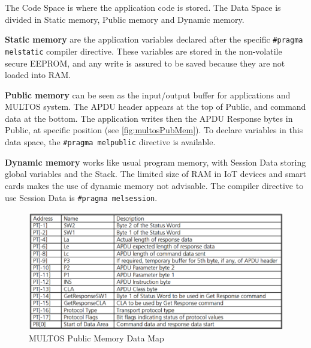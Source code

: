 The Code Space is where the application code is stored.
The Data Space is divided in Static memory, Public memory and Dynamic memory.

\textbf{Static memory} are the application variables declared after the specific \texttt{\#pragma melstatic} compiler directive. These variables are stored in the non-volatile secure EEPROM, and any write is assured to be saved because they are not loaded into RAM.

\textbf{Public memory} can be seen as the input/output buffer for applications and MULTOS system. The APDU header appears at the top of Public, and command data at the bottom. The application writes then the APDU Response bytes in Public, at specific position (see \autoref{fig:multosPubMem}). To declare variables in this data space, the \texttt{\#pragma melpublic} directive is available.

\textbf{Dynamic memory} works like usual program memory, with Session Data storing global variables and the Stack. The limited size of RAM in IoT devices and smart cards makes the use of dynamic memory not advisable. The compiler directive to use Session Data is \texttt{\#pragma melsession}.


\begin{figure}[bth]
	\begin{center}
		\includegraphics[width=\linewidth]{gfx/multosPubMem}
	\end{center}
	\caption{MULTOS Public Memory Data Map}
	\label{fig:multosPubMem}
\end{figure}


\hfil



